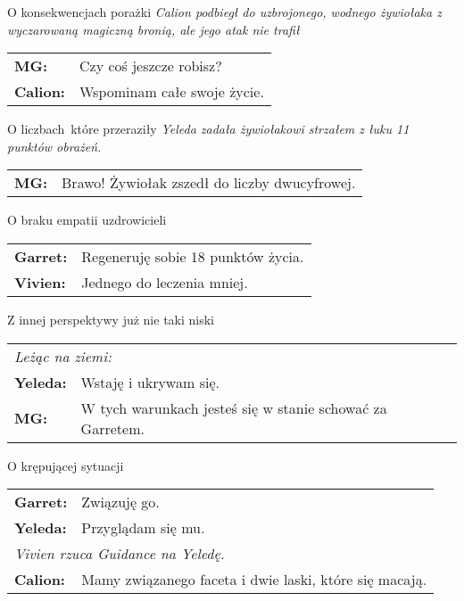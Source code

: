 \documentclass[10pt,twoside,twocolumn]{book}
\begin{document}
\begin{rpg-quotebox}{O konsekwencjach porażki}
   \textit{Calion podbiegł do uzbrojonego, wodnego żywiołaka z wyczarowaną magiczną bronią, ale jego atak nie trafił}\\
   
   \begin{tabularx}{\columnwidth}{lX}
      \textbf{MG:} & Czy coś jeszcze robisz?\\
      \textbf{Calion:} & Wspominam całe swoje życie.\\
   \end{tabularx}
\end{rpg-quotebox}

\begin{rpg-quotebox}{O liczbach\, które przeraziły}
   \textit{Yeleda zadała żywiołakowi strzałem z łuku 11 punktów obrażeń.}\\

   \begin{tabularx}{\columnwidth}{lX}
      \textbf{MG:} & Brawo! Żywiołak zszedł do liczby dwucyfrowej.\\
   \end{tabularx}
\end{rpg-quotebox}

\begin{rpg-quotebox}{O braku empatii uzdrowicieli}
   \begin{tabularx}{\columnwidth}{lX}
      \textbf{Garret:} & Regeneruję sobie 18 punktów życia.\\
      \textbf{Vivien:} & Jednego do leczenia mniej.\\
   \end{tabularx}
\end{rpg-quotebox}

\begin{rpg-quotebox}{Z innej perspektywy już nie taki niski}
   \begin{tabularx}{\columnwidth}{lX}
      \multicolumn{2}{l}{\textit{Leżąc na ziemi:}}\\
      \textbf{Yeleda:} & Wstaję i ukrywam się.\\
      \textbf{MG:} & W tych warunkach jesteś się w stanie schować za Garretem.\\
   \end{tabularx}
\end{rpg-quotebox}

\begin{rpg-quotebox}{O krępującej sytuacji}
   \begin{tabularx}{\columnwidth}{lX}
      \textbf{Garret:} & Związuję go.\\
      \textbf{Yeleda:} & Przyglądam się mu.\\
      \multicolumn{2}{l}{\textit{Vivien rzuca Guidance na Yeledę.}}\\
      \textbf{Calion:} & Mamy związanego faceta i dwie laski, które się macają.\\
   \end{tabularx}
\end{rpg-quotebox}
\end{document}
